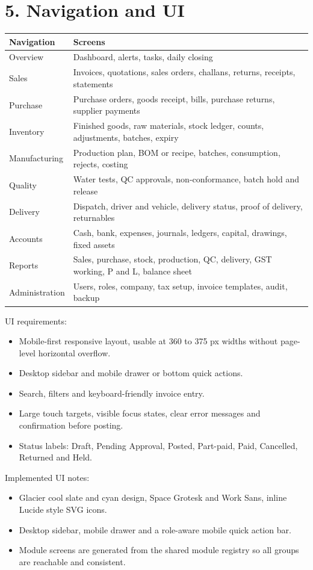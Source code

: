 \documentclass[11pt]{article}
\begin{document}
\section{5. Navigation and UI}
\begin{center}\small\begin{tabularx}{\linewidth}{|*{2}{>{\raggedright\arraybackslash}X|}}
\hline
\textbf{Navigation} & \textbf{Screens} \\
\hline
Overview & Dashboard, alerts, tasks, daily closing \\
\hline
Sales & Invoices, quotations, sales orders, challans, returns, receipts, statements \\
\hline
Purchase & Purchase orders, goods receipt, bills, purchase returns, supplier payments \\
\hline
Inventory & Finished goods, raw materials, stock ledger, counts, adjustments, batches, expiry \\
\hline
Manufacturing & Production plan, BOM or recipe, batches, consumption, rejects, costing \\
\hline
Quality & Water tests, QC approvals, non-conformance, batch hold and release \\
\hline
Delivery & Dispatch, driver and vehicle, delivery status, proof of delivery, returnables \\
\hline
Accounts & Cash, bank, expenses, journals, ledgers, capital, drawings, fixed assets \\
\hline
Reports & Sales, purchase, stock, production, QC, delivery, GST working, P and L, balance sheet \\
\hline
Administration & Users, roles, company, tax setup, invoice templates, audit, backup \\
\hline
\end{tabularx}\end{center}
UI requirements:
\begin{itemize}[leftmargin=*,itemsep=2pt,topsep=2pt]
\item Mobile-first responsive layout, usable at 360 to 375 px widths without page-level horizontal overflow.
\item Desktop sidebar and mobile drawer or bottom quick actions.
\item Search, filters and keyboard-friendly invoice entry.
\item Large touch targets, visible focus states, clear error messages and confirmation before posting.
\item Status labels: Draft, Pending Approval, Posted, Part-paid, Paid, Cancelled, Returned and Held.
\end{itemize}
Implemented UI notes:
\begin{itemize}[leftmargin=*,itemsep=2pt,topsep=2pt]
\item Glacier cool slate and cyan design, Space Grotesk and Work Sans, inline Lucide style SVG icons.
\item Desktop sidebar, mobile drawer and a role-aware mobile quick action bar.
\item Module screens are generated from the shared module registry so all groups are reachable and consistent.
\end{itemize}
\clearpage
\end{document}

